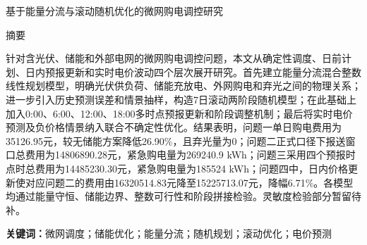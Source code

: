 \begin{center}{\heiti 基于能量分流与滚动随机优化的微网购电调控研究}\end{center}

\vspace{0.6em}
\begin{center}{\heiti 摘\quad 要}\end{center}
\vspace{0.4em}
{

针对含光伏、储能和外部电网的微网购电调控问题，本文从确定性调度、日前计划、日内预报更新和实时电价波动四个层次展开研究。首先建立能量分流混合整数线性规划模型，明确光伏供负荷、储能充放电、外网购电和弃光之间的物理关系；进一步引入历史预测误差和情景抽样，构造7日滚动两阶段随机模型；在此基础上加入0:00、6:00、12:00、18:00多时点预报更新和阶段调整机制；最后将实时电价预测及负价格情景纳入联合不确定性优化。结果表明，问题一单日购电费用为35126.95元，较无储能方案降低26.90\%，且弃光量为0；问题二正式口径下报送窗口总费用为14806890.28元，紧急购电量为269240.9 kWh；问题三采用四个预报时点时总费用为14485230.30元，紧急购电量为185524 kWh；问题四中，日内价格更新使对应问题二的费用由16320514.83元降至15225713.07元，降幅6.71\%。各模型均通过能量守恒、储能边界、整数可行性和阶段拼接检验。灵敏度检验部分暂留待补。

\noindent\textbf{关键词：}微网调度；储能优化；能量分流；随机规划；滚动优化；电价预测
}

\newpage
